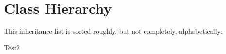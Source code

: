 \section{Class Hierarchy}
This inheritance list is sorted roughly, but not completely, alphabetically\+:\begin{DoxyCompactList}
\item Test2\begin{DoxyCompactList}
\item {}
\end{DoxyCompactList}
\end{DoxyCompactList}
